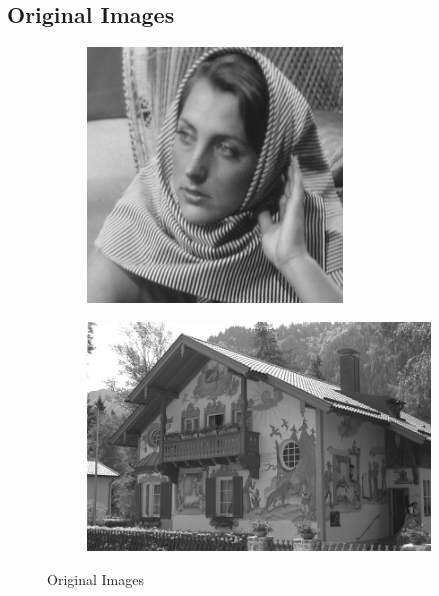 \documentclass{article}
\begin{document}
\subsection{Original Images}
\begin{figure}[H]
    \centering
    \begin{subfigure}[b]{0.45\textwidth}
        \includegraphics[width=\textwidth]{../images/barbara256.png}
    \end{subfigure}
    \begin{subfigure}[b]{0.45\textwidth}
        \includegraphics[width=\textwidth]{../images/kodak24.png}
    \end{subfigure}
    \caption{Original Images}
\end{figure}
\end{document}
